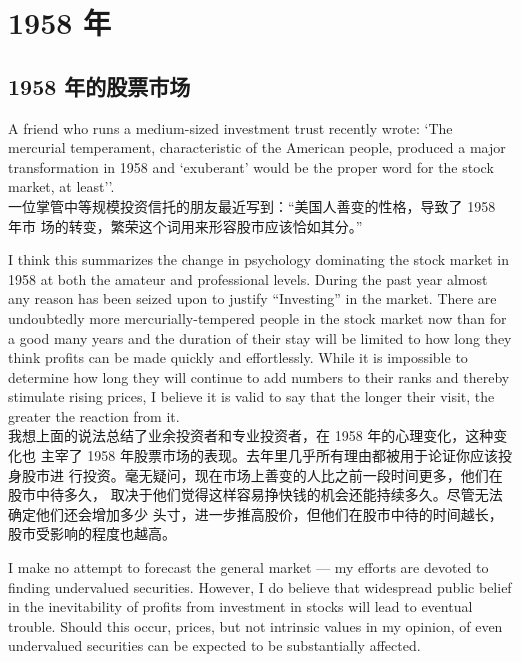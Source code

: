 \chapter{1958 年}

\section{1958 年的股票市场}

\begin{verseparallel}
  {
    \noindent A friend who runs a medium-sized investment trust recently wrote:
    `The mercurial temperament, characteristic of the American people, produced
    a major transformation in 1958 and `exuberant' would be the proper word
    for the stock market, at least''. \\
  }
  {
    一位掌管中等规模投资信托的朋友最近写到：“美国人善变的性格，导致了 1958 年市
    场的转变，繁荣这个词用来形容股市应该恰如其分。”
  }
\end{verseparallel}

\begin{verseparallel}
  {
    I think this summarizes the change in psychology dominating the stock market
    in 1958 at both the amateur and professional levels. During the past year
    almost any reason has been seized upon to justify “Investing” in the
    market. There are undoubtedly more mercurially-tempered people in the stock
    market now than for a good many years and the duration of their stay will be
    limited to how long they think profits can be made quickly and effortlessly.
    While it is impossible to determine how long they will continue to add
    numbers to their ranks and thereby stimulate rising prices, I believe it is
    valid to say that the longer their visit, the greater the reaction from it. \\
  }
  {
    我想上面的说法总结了业余投资者和专业投资者，在 1958 年的心理变化，这种变化也
    主宰了 1958 年股票市场的表现。去年里几乎所有理由都被用于论证你应该投身股市进
    行投资。毫无疑问，现在市场上善变的人比之前一段时间更多，他们在股市中待多久，
    取决于他们觉得这样容易挣快钱的机会还能持续多久。尽管无法确定他们还会增加多少
    头寸，进一步推高股价，但他们在股市中待的时间越长，股市受影响的程度也越高。
  }
\end{verseparallel}

\begin{verseparallel}
  {
    I make no attempt to forecast the general market --- my efforts are devoted
    to finding undervalued securities. However, I do believe that widespread
    public belief in the inevitability of profits from investment in stocks will
    lead to eventual trouble. Should this occur, prices, but not intrinsic
    values in my opinion, of even undervalued securities can be expected to be
    substantially affected. \\
  }
  {
  }
\end{verseparallel}

